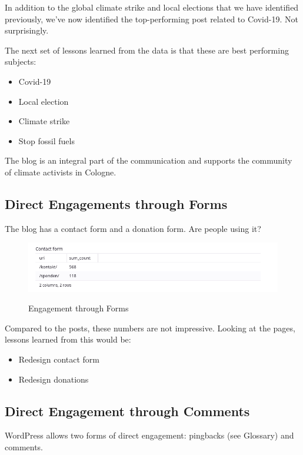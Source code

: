 In addition to the global climate strike and local elections that we have identified previously, we've now identified the top-performing post related to Covid-19. Not surprisingly.

The next set of lessons learned from the data is that these are best performing subjects:

\begin{itemize}
 \item Covid-19
 \item Local election
 \item Climate strike
 \item Stop fossil fuels
\end{itemize}

The blog is an integral part of the communication and supports the community of climate activists in Cologne.

\subsection{Direct Engagements through Forms}

The blog has a contact form and a donation form. Are people using it?

\begin{figure}[H]
\centering
\caption {Engagement through Forms}
\includegraphics[width=\linewidth]{images/figure14.png}
\label{fig:engagementForms}
\end{figure}

Compared to the posts, these numbers are not impressive. Looking at the pages, lessons learned from this would be:

\begin{itemize}
 \item Redesign contact form
 \item Redesign donations
\end{itemize}

\subsection{Direct Engagement through Comments}

WordPress allows two forms of direct engagement: pingbacks (see Glossary) and comments.

